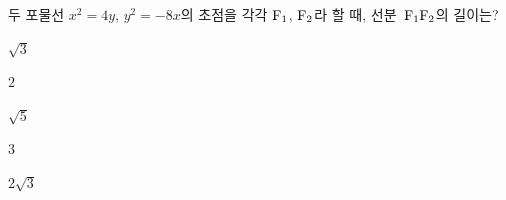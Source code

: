 두 포물선 $x^2=4y$, $y^2=-8x$의 초점을 각각 $\mathrm{F_1}$, $\mathrm{F_2}$라 할 때, 선분~$\mathrm{F_1F_2}$의 길이는?
\begin{choices32}{\rule[-3ex]{0pt}{8ex}$\sqrt{3}$}{\rule[-3ex]{0pt}{8ex}$2$}{\rule[-3ex]{0pt}{8ex}$\sqrt{5}$}{\rule[-3ex]{0pt}{8ex}$3$}{\rule[-3ex]{0pt}{8ex}$2\sqrt{3}$}\end{choices32}
